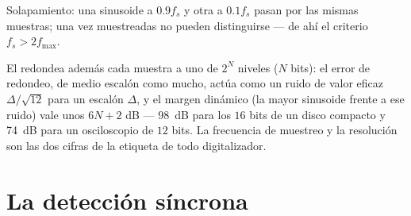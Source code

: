 \begin{omfigure}

{\small Solapamiento: una sinusoide a $0.9f_s$ y otra a $0.1f_s$ pasan por
las mismas muestras; una vez muestreadas no pueden distinguirse --- de ahí
el criterio $f_s > 2f_{\max}$.}
\end{omfigure}

\begin{remark}[La cuantificación]\label{rem:b2:feedback-oscillators:quantization}
El  redondea además cada muestra a uno de
$2^N$ niveles ($N$ bits): el error de redondeo, de medio escalón como
mucho, actúa como un ruido de valor eficaz $\Delta/\sqrt{12}$ para un
escalón $\Delta$, y el margen dinámico (la mayor sinusoide frente a ese
ruido) vale unos $6N + 2$ dB --- \qty{98}{dB} para los $16$ bits de un
disco compacto y \qty{74}{dB} para un osciloscopio de $12$ bits. La
frecuencia de muestreo y la resolución son las dos cifras de la etiqueta
de todo digitalizador.
\end{remark}

\section{La detección síncrona}

